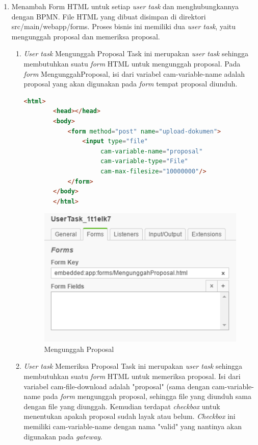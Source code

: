\begin{enumerate}
	\item Menambah Form HTML untuk setiap \textit{user task} dan menghubungkannya dengan BPMN. File HTML yang dibuat disimpan di direktori src/main/webapp/forms. Proses bisnis ini memiliki dua \textit{user task}, yaitu mengunggah proposal dan memeriksa proposal. 
	
\begin{enumerate}
	\item \textit{User task} Mengunggah Proposal
	Task ini merupakan \textit{user task} sehingga membutuhkan suatu \textit{form} HTML untuk mengunggah proposal. Pada \textit{form} MengunggahProposal, isi dari variabel cam-variable-name adalah proposal yang akan digunakan pada \textit{form} tempat proposal diunduh.

	
	\begin{lstlisting}[language=html,basicstyle=\tiny,caption=MengunggahProposal.html]
		<html>
		<head></head>
		<body>
			<form method="post" name="upload-dokumen">
				<input type="file"
					 cam-variable-name="proposal" 
					 cam-variable-type="File"
					 cam-max-filesize="10000000"/>
			</form>
		</body>
		</html>
	\end{lstlisting}
	
		\begin{figure}[H]
			\centering
			\includegraphics[scale=1]{Gambar/Bab-3/Kasus1/2form}
			\caption{Mengunggah Proposal} 
			\label{fig:pengajuanproposal_mengunggahproposalform}
	\end{figure}


\item \textit{User task} Memeriksa Proposal Task ini merupakan \textit{user task} sehingga membutuhkan suatu \textit{form} HTML untuk memeriksa proposal. Isi dari variabel cam-file-download adalah "proposal" (sama dengan cam-variable-name pada \textit{form} mengunggah proposal, sehingga file yang diunduh sama dengan file yang diunggah. Kemudian terdapat \textit{checkbox} untuk menentukan apakah proposal sudah layak atau belum. \textit{Checkbox} ini memiliki cam-variable-name dengan nama "valid" yang nantinya akan digunakan pada \textit{gateway}.


\end{enumerate}
\end{enumerate}

